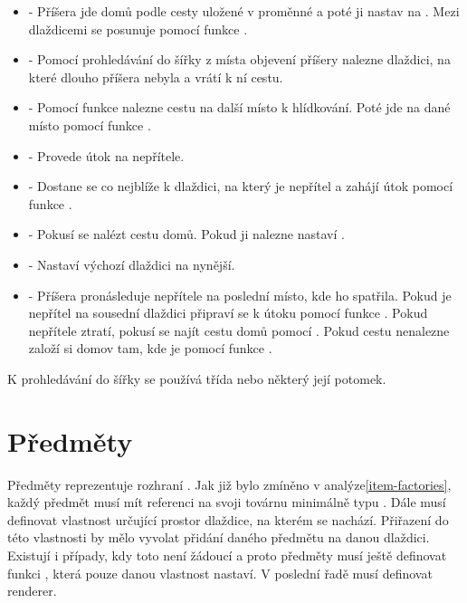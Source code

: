 \begin{itemize}
\item {} - Příšera jde domů podle cesty uložené v proměnné  a poté ji nastav na . 
         Mezi dlaždicemi se posunuje pomocí funkce .

\item {} - Pomocí prohledávání do šířky z místa objevení příšery nalezne dlaždici, na které dlouho
příšera nebyla a vrátí k ní cestu.

\item {} - Pomocí funkce  nalezne cestu na další místo k hlídkování. Poté jde na dané místo
 pomocí funkce .

\item {} - Provede útok na nepřítele.

\item {} - Dostane se co nejblíže k dlaždici, na který je nepřítel a zahájí útok pomocí funkce .

\item {} - Pokusí se nalézt cestu domů. Pokud ji nalezne nastaví .

\item {} - Nastaví výchozí dlaždici na nynější.

\item {} - Příšera pronásleduje nepřítele na poslední místo, kde ho spatřila. Pokud je nepřítel na sousední dlaždici připraví
se k útoku pomocí funkce . Pokud nepřítele ztratí, pokusí se najít cestu domů pomocí . Pokud
cestu nenalezne založí si domov tam, kde je pomocí funkce .

\end{itemize}

K prohledávání do šířky se používá třída  nebo některý její potomek. 

\section{Předměty}
Předměty reprezentuje rozhraní . Jak již bylo zmíněno v analýze\vref{item-factories}, každý předmět musí mít referenci na svoji 
továrnu minimálně typu . Dále musí definovat vlastnost  určující prostor dlaždice, na kterém se nachází. 
Přiřazení do této vlastnosti by mělo vyvolat přidání daného předmětu na danou dlaždici. Existují i případy, kdy toto není 
žádoucí a proto předměty musí ještě definovat funkci , která pouze danou vlastnost nastaví. V poslední řadě musí definovat renderer.

